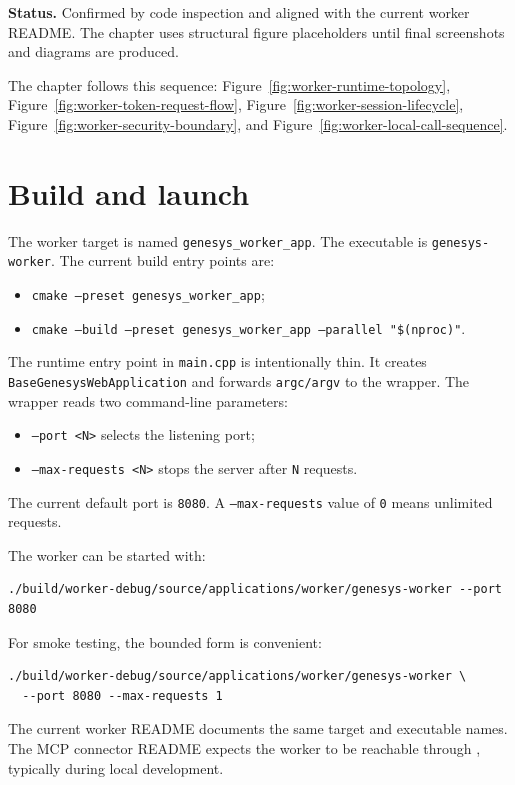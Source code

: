 \noindent\textbf{Status.} Confirmed by code inspection and aligned with the
current worker README. The chapter uses structural figure placeholders until
final screenshots and diagrams are produced.

The chapter follows this sequence:
Figure~\ref{fig:worker-runtime-topology},
Figure~\ref{fig:worker-token-request-flow},
Figure~\ref{fig:worker-session-lifecycle},
Figure~\ref{fig:worker-security-boundary}, and
Figure~\ref{fig:worker-local-call-sequence}.

\section{Build and launch}
\label{sec:worker-build-and-launch}

The worker target is named \texttt{genesys\_worker\_app}. The executable is
\texttt{genesys-worker}. The current build entry points are:
\begin{itemize}
\item \texttt{cmake --preset genesys\_worker\_app};
\item \texttt{cmake --build --preset genesys\_worker\_app --parallel "\$(nproc)"}.
\end{itemize}

The runtime entry point in \texttt{main.cpp} is intentionally thin. It creates
\texttt{BaseGenesysWebApplication} and forwards \texttt{argc/argv} to the
wrapper. The wrapper reads two command-line parameters:
\begin{itemize}
\item \texttt{--port <N>} selects the listening port;
\item \texttt{--max-requests <N>} stops the server after \texttt{N} requests.
\end{itemize}

The current default port is \texttt{8080}. A \texttt{--max-requests} value of
\texttt{0} means unlimited requests.

The worker can be started with:
\begin{verbatim}
./build/worker-debug/source/applications/worker/genesys-worker --port 8080
\end{verbatim}

For smoke testing, the bounded form is convenient:
\begin{verbatim}
./build/worker-debug/source/applications/worker/genesys-worker \
  --port 8080 --max-requests 1
\end{verbatim}

The current worker README documents the same target and executable names. The
MCP connector README expects the worker to be reachable through
, typically  during local
development.

